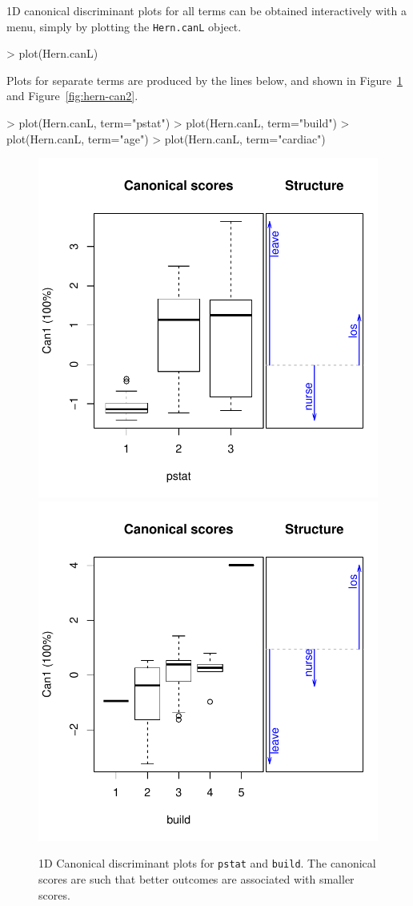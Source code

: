 \documentclass[11pt]{article}
\newcommand{\figref}[1]{Figure~\ref{#1}}
\newcommand{\code}[1]{{\texttt{#1}}}
\begin{document}
1D canonical discriminant plots for all terms can be obtained interactively 
with a menu, simply by plotting the \code{Hern.canL} object.
\begin{Schunk}
\begin{Sinput}
> plot(Hern.canL)
\end{Sinput}
\end{Schunk}
Plots for separate terms are produced by the lines below, and shown in 
\figref{fig:hern-can1} and \figref{fig:hern-can2}.
\begin{Schunk}
\begin{Sinput}
> plot(Hern.canL, term="pstat")
> plot(Hern.canL, term="build")
> plot(Hern.canL, term="age")
> plot(Hern.canL, term="cardiac")
\end{Sinput}
\end{Schunk}

\begin{figure}[htb]
\begin{center}
	\includegraphics[width=.48\textwidth]{fig/plot-hern-can-pstat}
	\includegraphics[width=.48\textwidth]{fig/plot-hern-can-build}
\caption{1D Canonical discriminant plots for \code{pstat} and \code{build}.
	The canonical scores are such that better outcomes are associated with smaller scores.}
\label{fig:hern-can1}
\end{center}
\end{figure}
\end{document}
